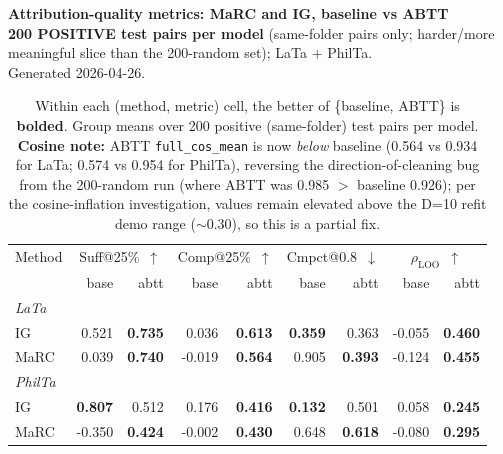 \documentclass[11pt]{article}
\begin{document}
\begin{center}
{\large\bfseries Attribution-quality metrics: MaRC and IG, baseline vs ABTT}\\[2pt]
{\small \textbf{200 POSITIVE test pairs per model} (same-folder pairs only; harder/more meaningful slice than the 200-random set); LaTa + PhilTa.\\
Generated 2026-04-26.}
\end{center}

\vspace{0.4em}

\begin{table}[h]
\centering
\footnotesize
\setlength{\tabcolsep}{3pt}
\begin{tabular}{lrrrrrrrr}
\toprule
Method & \multicolumn{2}{c}{Suff@25\%~$\uparrow$} & \multicolumn{2}{c}{Comp@25\%~$\uparrow$} & \multicolumn{2}{c}{Cmpct@0.8~$\downarrow$} & \multicolumn{2}{c}{$\rho_{\text{LOO}}$~$\uparrow$} \\
\cmidrule(lr){2-3} \cmidrule(lr){4-5} \cmidrule(lr){6-7} \cmidrule(lr){8-9}
 & base & abtt & base & abtt & base & abtt & base & abtt \\
\midrule
\multicolumn{9}{l}{\textit{LaTa}} \\
IG   & 0.521          & \textbf{0.735} & 0.036          & \textbf{0.613} & \textbf{0.359} & 0.363          & -0.055         & \textbf{0.460} \\
MaRC & 0.039          & \textbf{0.740} & -0.019         & \textbf{0.564} & 0.905          & \textbf{0.393} & -0.124         & \textbf{0.455} \\
\midrule
\multicolumn{9}{l}{\textit{PhilTa}} \\
IG   & \textbf{0.807} & 0.512          & 0.176          & \textbf{0.416} & \textbf{0.132} & 0.501          & 0.058          & \textbf{0.245} \\
MaRC & -0.350         & \textbf{0.424} & -0.002         & \textbf{0.430} & 0.648          & \textbf{0.618} & -0.080         & \textbf{0.295} \\
\bottomrule
\end{tabular}
\caption*{Within each (method, metric) cell, the better of \{baseline, ABTT\} is \textbf{bolded}. Group means over 200 positive (same-folder) test pairs per model. \textbf{Cosine note:} ABTT \texttt{full\_cos\_mean} is now \emph{below} baseline (0.564 vs 0.934 for LaTa; 0.574 vs 0.954 for PhilTa), reversing the direction-of-cleaning bug from the 200-random run (where ABTT was 0.985 $>$ baseline 0.926); per the cosine-inflation investigation, values remain elevated above the D=10 refit demo range ($\sim 0.30$), so this is a partial fix.}
\end{table}
\end{document}
